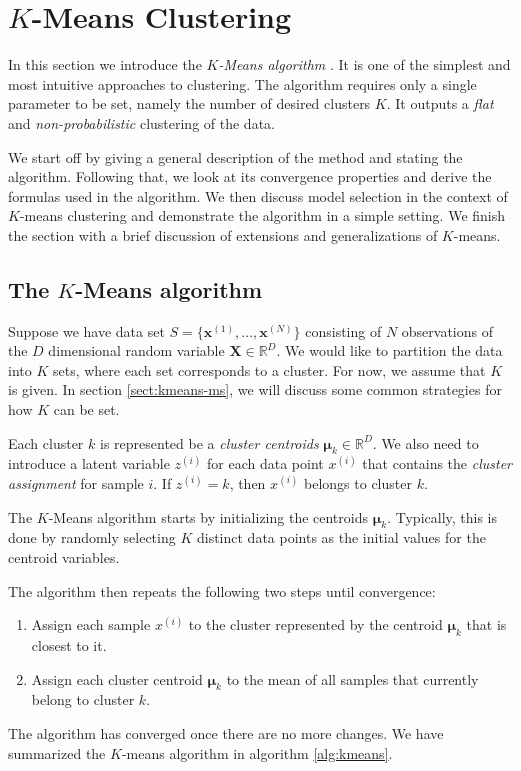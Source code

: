 \documentclass[final,3p,times,twocolumn]{elsarticle}
\let\bs\boldsymbol
\begin{document}
\section{$K$-Means Clustering}
In this section we introduce the \emph{$K$-Means algorithm} \cite{lloyd1982}.
It is one of the simplest and most intuitive approaches to clustering.
The algorithm requires only a single parameter to be set, namely the number of desired clusters $K$. 
It outputs a \emph{flat} and \emph{non-probabilistic} clustering of the data.

We start off by giving a general description of the method and stating the algorithm.
Following that, we look at its convergence properties and derive the formulas used in the algorithm.
We then discuss model selection in the context of $K$-means clustering and demonstrate the algorithm in a simple setting.
We finish the section with a brief discussion of extensions and generalizations of $K$-means.

\subsection{The $K$-Means algorithm}
Suppose we have data set $S = \{\bs x^{(1)},\dots,\bs x^{(N)}\}$ consisting of $N$ observations of the $D$ dimensional random variable $\bs X \in \mathbb{R}^D$.
We would like to partition the data into $K$ sets, where each set corresponds to a cluster.
For now, we assume that $K$ is given. In section \ref{sect:kmeans-ms}, we will discuss some common strategies for how $K$ can be set.

Each cluster $k$ is represented be a \emph{cluster centroids} $\bs\mu_k \in \mathbb{R}^D$.
We also need to introduce a latent variable $z^{(i)}$ for each data point $x^{(i)}$ that contains the \emph{cluster assignment} for sample $i$.
If $z^{(i)} = k$, then $x^{(i)}$ belongs to cluster $k$.

The $K$-Means algorithm starts by initializing the centroids $\boldsymbol \mu_k$.
Typically, this is done by randomly selecting $K$ distinct data points as the initial values for the centroid variables.

The algorithm then repeats the following two steps until convergence:
\begin{enumerate}
\item Assign each sample $x^{(i)}$ to the cluster represented by the centroid $\bs\mu_k$ that is closest to it.
\item Assign each cluster centroid $\bs\mu_k$ to the mean of all samples that currently belong to cluster $k$.
\end{enumerate}
The algorithm has converged once there are no more changes.
We have summarized the $K$-means algorithm in algorithm \ref{alg:kmeans}.
\end{document}
